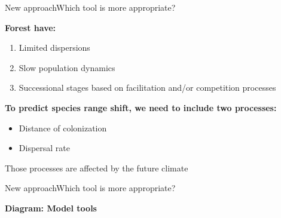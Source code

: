 \documentclass[10pt,aspectratio=149]{beamer}
\begin{document}
			  


\begin{frame}{New approach}{Which tool is more appropriate?}

\textbf{Forest have:}
		\begin{enumerate}
			\item Limited dispersions
			\item Slow population dynamics
			\item Successional stages based on facilitation and/or competition processes
		\end{enumerate}
\vspace{1em}
\pause
\textbf{To predict species range shift, we need to include \alert{two processes:}}
	\begin{itemize}
		\item Distance of colonization %
		\item Dispersal rate %
	\end{itemize}
	\pause
	\alert{Those processes are affected by the future climate}

\end{frame}


\begin{frame}{New approach}{Which tool is more appropriate?}
	
\textbf{Diagram: Model tools}	
	
\end{frame}

\end{document}
